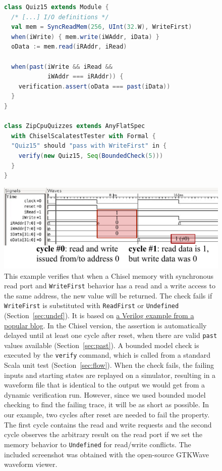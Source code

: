 \documentclass[conference]{IEEEtran}
\newcommand{\code}[1]{{\small{\texttt{#1}}}}
\begin{document}
\begin{figure}
    \centering
\begin{lstlisting}[language=scala]
class Quiz15 extends Module {
  /* [...] I/O definitions */
  val mem = SyncReadMem(256, UInt(32.W), WriteFirst)
  when(iWrite) { mem.write(iWAddr, iData) }
  oData := mem.read(iRAddr, iRead)

  when(past(iWrite && iRead &&
            iWAddr === iRAddr)) {
    verification.assert(oData === past(iData))
  }
}

class ZipCpuQuizzes extends AnyFlatSpec
  with ChiselScalatestTester with Formal {
  "Quiz15" should "pass with WriteFirst" in {
    verify(new Quiz15, Seq(BoundedCheck(5)))
  }
}
\end{lstlisting}

\includegraphics{woset_2021_quiz15.pdf}
\caption[Chisel verification example.]{This example verifies that when a Chisel memory with synchronous read port and
\code{WriteFirst} behavior has a read and a write access to the same address,
the new value will be returned.
The check fails if \code{WriteFirst} is substituted with \code{ReadFirst} or \code{Undefined} (Section~\ref{sec:undef}).
It is based on \href{https://zipcpu.com/answer/2021/07/03/fv-answer15.html}{a Verilog example from a popular blog}.
In the Chisel version, the assertion is automatically delayed until at least one cycle after reset, when there are valid \code{past} values available
(Section~\ref{sec:past}).
A bounded model check is executed by the \code{verify} command, which is called from a standard Scala unit test (Section~\ref{sec:flow}).
When the check fails, the failing inputs and starting states are replayed on a simulator, resulting in a waveform file that is identical
to the output we would get from a dynamic verification run.
However, since we used bounded model checking to find the failing trace, it will be as short as possible.
In our example, two cycles after reset are needed to fail the property.
The first cycle contains the read and write requests and the second cycle observes the arbitrary result on the read port if
we set the memory behavior to \code{Undefined} for read/write conflicts.
The included screenshot was obtained with the open-source GTKWave waveform viewer.
}
\label{fig:quiz15}
\end{figure}
\end{document}
